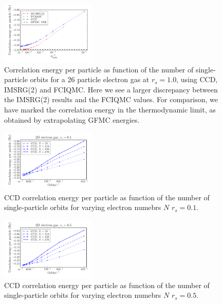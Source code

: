 \documentclass[aps,twocolumn,showpacs,floatfix,nofootinbib,preprintnumbers,superscriptaddress,amsmath,amssymb]{revtex4-1}
\begin{document}
\begin{figure}[hbtp]
     \begin{center}

            \includegraphics[width=0.4\textwidth]{figures/nOrbitsEneN26Rs10.pdf}
    \end{center}
    \caption{Correlation energy per particle as function of the number of
single-particle orbits for a 26 particle electron gas at $r_s=1.0$, using CCD, IMSRG(2) 
and FCIQMC. Here we see a larger discrepancy between the IMSRG(2) results and the FCIQMC values. 
For comparison, we have marked the correlation
energy in the thermodynamic limit, as obtained by extrapolating GFMC
energies.}
            \label{fig:N26}
\end{figure}


\begin{figure}[hbtp]
     \begin{center}

            \includegraphics[width=0.4\textwidth]{figures/nOrbitsEneNRs01.pdf}
    \end{center}
    \caption{CCD correlation energy per particle as function of the number of
single-particle orbits for varying  electron numebrs $N$ $r_s=0.1$.}
            \label{fig:ccd01}
\end{figure}

\begin{figure}[hbtp]
     \begin{center}

            \includegraphics[width=0.4\textwidth]{figures/nOrbitsEneNRs05.pdf}
    \end{center}
    \caption{CCD correlation energy per particle as function of the number of
single-particle orbits for varying  electron numebrs $N$ $r_s=0.5$.}
            \label{fig:ccd05}
\end{figure}
\end{document}
